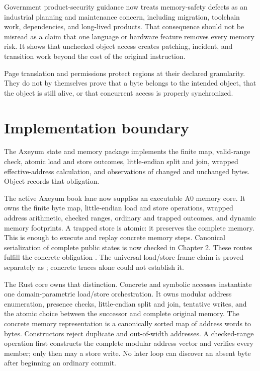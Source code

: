 Government product-security guidance now treats memory-safety defects as an
industrial planning and maintenance concern, including migration, toolchain
work, dependencies, and long-lived products. That consequence should not be
misread as a claim that one language or hardware feature removes every memory
risk. It shows that unchecked object access creates patching, incident, and
transition work beyond the cost of the original instruction.
\autocite{cisa2023memorysafe}

\begin{warning}[title={Mapped does not mean safe}]
Page translation and permissions protect regions at their declared
granularity. They do not by themselves prove that a byte belongs to the
intended object, that the object is still alive, or that concurrent access is
properly synchronized.
\end{warning}

\section{Implementation boundary}

The Axeyum state and memory package implements the finite map, valid-range
check, atomic load and store outcomes, little-endian split and join, wrapped
effective-address calculation, and observations of changed and unchanged
bytes. Object  records that obligation.

The active Axeyum book lane now supplies an executable A0 memory core. It owns
the finite byte map, little-endian load and store operations, wrapped address
arithmetic, checked ranges, ordinary and trapped outcomes, and dynamic memory
footprints. A trapped store is atomic: it preserves the complete memory. This
is enough to execute and replay concrete memory steps. Canonical serialization
of complete public states is now checked in Chapter 2. These routes fulfill the
concrete obligation . The universal load/store frame
claim is proved separately as ; concrete traces alone
could not establish it.

The Rust core owns that distinction. Concrete and symbolic accesses instantiate
one domain-parametric load/store orchestration. It owns modular address
enumeration, presence checks, little-endian split and join, tentative writes,
and the atomic choice between the successor and complete original memory. The
concrete memory representation is a
canonically sorted map of address words to bytes. Constructors reject duplicate
and out-of-width addresses. A checked-range operation first constructs the
complete modular address vector and verifies every member; only then may a
store write. No later loop can discover an absent byte after beginning an
ordinary commit.

